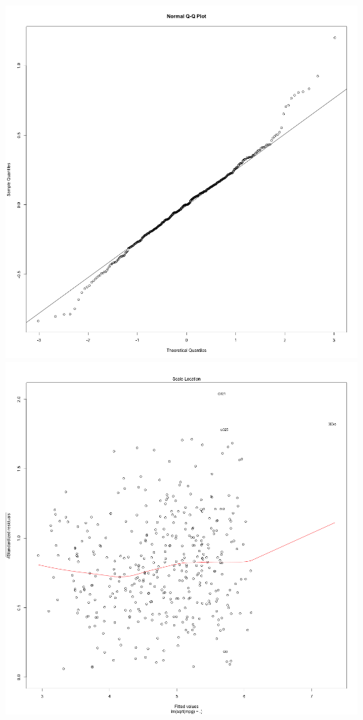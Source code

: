 \documentclass[11pt]{article} %
\begin{document}
\begin{center}
\includegraphics[scale=0.13]{sqrt_QQplot}
\includegraphics[scale=0.13]{sqrt_Variance}
\end{center}
\end{document}
